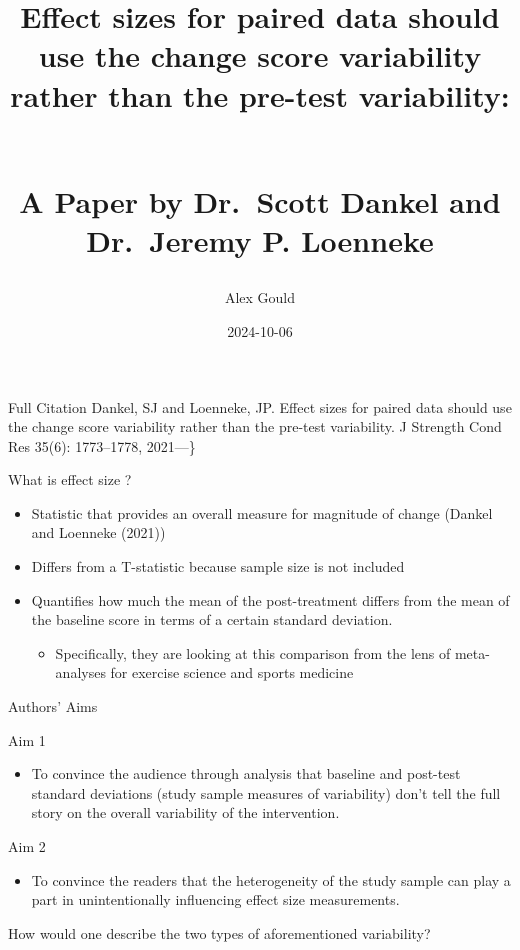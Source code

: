 \documentclass[
  ignorenonframetext,
  aspectratio=169,
]{beamer}
\title{Effect sizes for paired data should use the change score
variability rather than the pre-test variability:\\
\strut \\
A Paper by Dr.~Scott Dankel and Dr.~Jeremy P. Loenneke}
\author{Alex Gould}
\date{2024-10-06}
\providecommand{\tightlist}{%
  \setlength{\itemsep}{0pt}\setlength{\parskip}{0pt}}
\begin{document}
\frame{\titlepage}

\begin{frame}{Full Citation}
\protect\hypertarget{full-citation}{}
Dankel, SJ and Loenneke, JP. Effect sizes for paired data should use the
change score variability rather than the pre-test variability. J
Strength Cond Res 35(6): 1773--1778, 2021---\}
\end{frame}

\begin{frame}{What is effect size ?}
\protect\hypertarget{what-is-effect-size}{}
\begin{itemize}
\tightlist
\item
  Statistic that provides an overall measure for magnitude of change
  (Dankel and Loenneke (2021))
\item
  Differs from a T-statistic because sample size is not included
\item
  Quantifies how much the mean of the post-treatment differs from the
  mean of the baseline score in terms of a certain standard deviation.

  \begin{itemize}
  \tightlist
  \item
    Specifically, they are looking at this comparison from the lens of
    meta-analyses for exercise science and sports medicine
  \end{itemize}
\end{itemize}
\end{frame}

\begin{frame}{Authors' Aims}
\protect\hypertarget{authors-aims}{}
\begin{block}{Aim 1}
\protect\hypertarget{aim-1}{}
\begin{itemize}
\tightlist
\item
  To convince the audience through analysis that baseline and post-test
  standard deviations (study sample measures of variability) don't tell
  the full story on the overall variability of the intervention.
\end{itemize}
\end{block}

\begin{block}{Aim 2}
\protect\hypertarget{aim-2}{}
\begin{itemize}
\tightlist
\item
  To convince the readers that the heterogeneity of the study sample can
  play a part in unintentionally influencing effect size measurements.
\end{itemize}
\end{block}

\begin{block}{How would one describe the two types of aforementioned
variability?}
\protect\hypertarget{how-would-one-describe-the-two-types-of-aforementioned-variability}{}
\end{block}
\end{frame}
\end{document}
